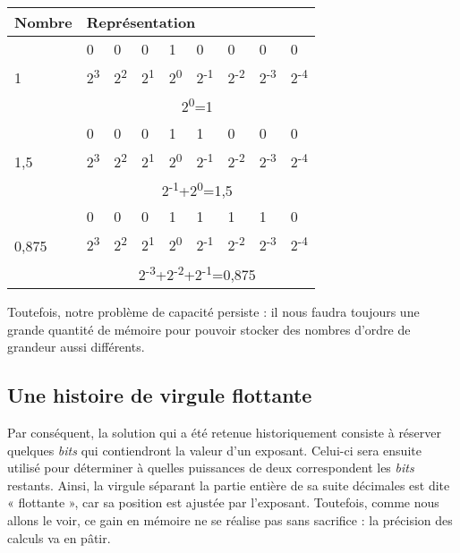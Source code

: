 \begin{table}
\centering
\begin{tabular}{|l|l|l|l|l|l|l|l|l|}\hline
  \rowcolor{gris-tab-entete}\bf Nombre&\multicolumn{8}{l|}{\bf Représentation}\\
  \hline
  \multirow{3}{2cm}{1} & 0 & 0 & 0 & 1 & 0 & 0 & 0 & 0 \\ 
  \cline{2-9}
  &2\textsuperscript{3}&2\textsuperscript{2}&2\textsuperscript{1}&2\textsuperscript{0}&2\textsuperscript{-1}&2\textsuperscript{-2}&2\textsuperscript{-3}&2\textsuperscript{-4}\\ 
  \cline{2-9}
   &\multicolumn{8}{c|}{2\textsuperscript{0}=1}\\ 
  \hline
  \multirow{3}{2cm}{1,5} & 0 & 0 & 0 & 1 & 1 & 0 & 0 & 0 \\
  \cline{2-9}
  &2\textsuperscript{3}&2\textsuperscript{2}&2\textsuperscript{1}&2\textsuperscript{0}&2\textsuperscript{-1}&2\textsuperscript{-2}&2\textsuperscript{-3}&2\textsuperscript{-4}\\ 
  \cline{2-9}
  &\multicolumn{8}{c|}{2\textsuperscript{-1}+2\textsuperscript{0}=1,5}\\
  \hline
  \multirow{3}{2cm}{0,875} & 0 & 0 & 0 & 1 & 1 & 1 & 1 & 0 \\
  \cline{2-9}
  &2\textsuperscript{3}&2\textsuperscript{2}&2\textsuperscript{1}&2\textsuperscript{0}&2\textsuperscript{-1}&2\textsuperscript{-2}&2\textsuperscript{-3}&2\textsuperscript{-4}\\ 
  \cline{2-9}
  &\multicolumn{8}{c|}{2\textsuperscript{-3}+2\textsuperscript{-2}+2\textsuperscript{-1}=0,875}\\
  \hline
\end{tabular}
\end{table}

Toutefois, notre problème de capacité persiste : il nous faudra toujours
une grande quantité de mémoire pour pouvoir stocker des nombres d'ordre
de grandeur aussi différents.

\subsection{Une histoire de virgule flottante}
\label{une-histoire-de-virgule-flottante}

Par conséquent, la solution qui a été retenue historiquement consiste à
réserver quelques \emph{bits} qui contiendront la valeur d'un exposant.
Celui-ci sera ensuite utilisé pour déterminer à quelles puissances de
deux correspondent les \emph{bits} restants. Ainsi, la virgule séparant
la partie entière de sa suite décimales est dite « flottante », car sa
position est ajustée par l'exposant. Toutefois, comme nous allons le
voir, ce gain en mémoire ne se réalise pas sans sacrifice : la précision
des calculs va en pâtir.

